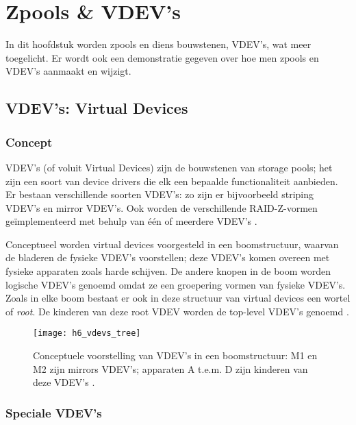 

\chapter{Zpools \& VDEV's}
\label{ch:h6}

In dit hoofdstuk worden zpools en diens bouwstenen, VDEV's, wat meer toegelicht. Er wordt ook een demonstratie gegeven over hoe men zpools en VDEV's aanmaakt en wijzigt.

\section{VDEV's: Virtual Devices}

\subsection{Concept}

VDEV's (of voluit Virtual Devices) zijn de bouwstenen van storage pools; het zijn een soort van device drivers die elk een bepaalde functionaliteit aanbieden. Er bestaan verschillende soorten VDEV's: zo zijn er bijvoorbeeld striping VDEV's en mirror VDEV's. Ook worden de verschillende RAID-Z-vormen geïmplementeerd met behulp van één of meerdere VDEV's \autocite{ZFSBonwick}.

Conceptueel worden virtual devices voorgesteld in een boomstructuur, waarvan de bladeren de fysieke VDEV's voorstellen; deze VDEV's komen overeen met fysieke apparaten zoals harde schijven. De andere knopen in de boom worden logische VDEV's genoemd omdat ze een groepering vormen van fysieke VDEV's. Zoals in elke boom bestaat er ook in deze structuur van virtual devices een wortel of \textit{root}. De kinderen van deze root VDEV worden de top-level VDEV's genoemd \autocite{Microsystems2006}.

\begin{figure}
  \centering
  \texttt{[image: h6\_vdevs\_tree]}
  \caption{Conceptuele voorstelling van VDEV's in een boomstructuur: M1 en M2 zijn mirrors VDEV's; apparaten A t.e.m. D zijn kinderen van deze VDEV's \autocite{Microsystems2006}.}
  \label{fig:vdevs_boom}
\end{figure}

\subsection{Speciale VDEV's}

